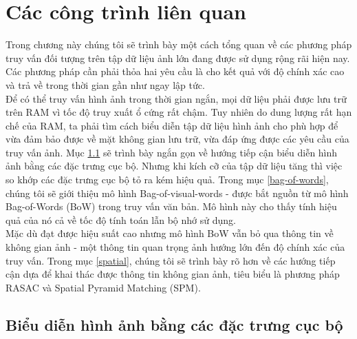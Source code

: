 \chapter{Các công trình liên quan}
\ifpdf
    \graphicspath{{Chapter2/Chapter2Figs/PNG/}{Chapter2/Chapter2Figs/PDF/}{Chapter2/Chapter2Figs/}}
\else
    \graphicspath{{Chapter2/Chapter2Figs/EPS/}{Chapter2/Chapter2Figs/}}
\fi

Trong chương này chúng tôi sẽ trình bày một cách tổng quan về các phương pháp truy vấn đối tượng trên tập dữ liệu ảnh lớn đang được sử dụng rộng rãi hiện nay. Các phương pháp cần phải thỏa hai yêu cầu là cho kết quả với độ chính xác cao và trả về trong thời gian gần như ngay lập tức.\\
Để có thể truy vấn hình ảnh trong thời gian ngắn, mọi dữ liệu phải được lưu trữ trên RAM vì tốc độ truy xuất ổ cứng rất chậm. Tuy nhiên do dung lượng rất hạn chế của RAM, ta phải tìm cách biểu diễn tập dữ liệu hình ảnh cho phù hợp để vừa đảm bảo được về mặt không gian lưu trữ, vừa đáp ứng được các yêu cầu của truy vấn ảnh. Mục \ref{local-features} sẽ trình bày ngắn gọn về hướng tiếp cận biểu diễn hình ảnh bằng các đặc trưng cục bộ. Nhưng khi kích cỡ của tập dữ liệu tăng thì việc so khớp các đặc trưng cục bộ tỏ ra kém hiệu quả. Trong mục \ref{bag-of-words}, chúng tôi sẽ giới thiệu mô hình Bag-of-visual-words -  được bắt nguồn từ mô hình Bag-of-Words (BoW) trong truy vấn văn bản. Mô hình này cho thấy tính hiệu quả của nó cả về tốc độ tính toán lẫn bộ nhớ sử dụng.\\
Mặc dù đạt được hiệu suất cao nhưng mô hình BoW vẫn bỏ qua thông tin về không gian ảnh - một thông tin quan trọng ảnh hướng lớn đến độ chính xác của truy vấn. Trong mục \ref{spatial}, chúng tôi sẽ trình bày rõ hơn về các hướng tiếp cận dựa để khai thác được thông tin không gian ảnh, tiêu biểu là phương pháp RASAC và Spatial Pyramid Matching (SPM).\\



\section{Biểu diễn hình ảnh bằng các đặc trưng cục bộ}
\label{local-features}

